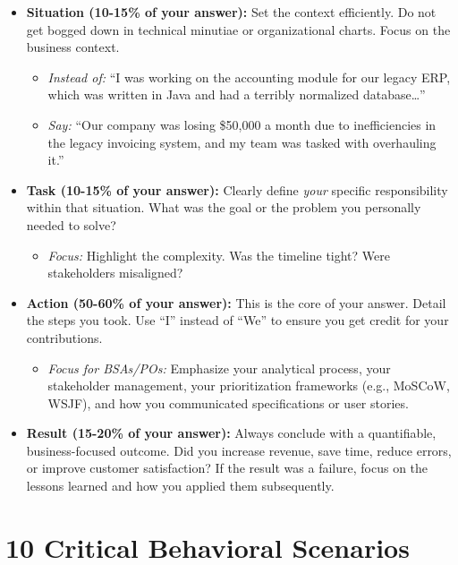 \begin{itemize}
\tightlist
\item
  \textbf{Situation (10-15\% of your answer):} Set the context
  efficiently. Do not get bogged down in technical minutiae or
  organizational charts. Focus on the business context.

  \begin{itemize}
  \tightlist
  \item
    \emph{Instead of:} ``I was working on the accounting module for our
    legacy ERP, which was written in Java and had a terribly normalized
    database\ldots{}''
  \item
    \emph{Say:} ``Our company was losing \$50,000 a month due to
    inefficiencies in the legacy invoicing system, and my team was
    tasked with overhauling it.''
  \end{itemize}
\item
  \textbf{Task (10-15\% of your answer):} Clearly define \emph{your}
  specific responsibility within that situation. What was the goal or
  the problem you personally needed to solve?

  \begin{itemize}
  \tightlist
  \item
    \emph{Focus:} Highlight the complexity. Was the timeline tight? Were
    stakeholders misaligned?
  \end{itemize}
\item
  \textbf{Action (50-60\% of your answer):} This is the core of your
  answer. Detail the steps you took. Use ``I'' instead of ``We'' to
  ensure you get credit for your contributions.

  \begin{itemize}
  \tightlist
  \item
    \emph{Focus for BSAs/POs:} Emphasize your analytical process, your
    stakeholder management, your prioritization frameworks (e.g.,
    MoSCoW, WSJF), and how you communicated specifications or user
    stories.
  \end{itemize}
\item
  \textbf{Result (15-20\% of your answer):} Always conclude with a
  quantifiable, business-focused outcome. Did you increase revenue, save
  time, reduce errors, or improve customer satisfaction? If the result
  was a failure, focus on the lessons learned and how you applied them
  subsequently.
\end{itemize}

\bigskip

\section{10 Critical Behavioral
Scenarios}\label{critical-behavioral-scenarios}

